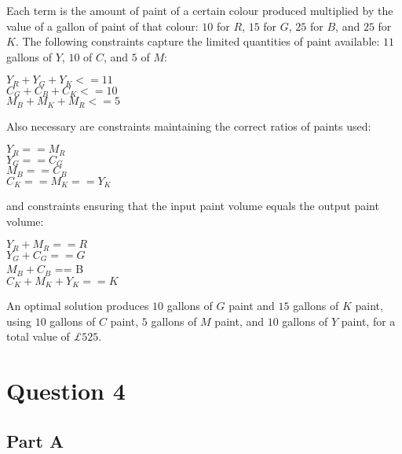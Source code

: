 \documentclass[11pt]{article} %
\begin{document}
Each term is the amount of paint of a certain colour produced multiplied by the value of a gallon of paint of that colour: $10$ for $R$, $15$ for $G$, $25$ for $B$, and $25$ for $K$. The following constraints capture the limited quantities of paint available: $11$ gallons of $Y$, $10$ of $C$, and $5$ of $M$:

\begin {center}

$Y_R + Y_G + Y_K <= 11$ \\
$C_G + C_B + C_K <= 10$ \\
$M_B + M_K +M_R <= 5$ \\

\end{center}

Also necessary are constraints maintaining the correct ratios of paints used:

\begin{center}

$Y_R == M_R$ \\
$Y_G == C_G$ \\
$M_B == C_B$ \\
$C_K == M_K == Y_K$ \\

\end{center}

and constraints ensuring that the input paint volume equals the output paint volume:

\begin{center}

$Y_R + M_R ==  R$ \\
$Y_G + C_G == G$ \\
$M_B + C_B$ == B \\
$C_K + M_K + Y_K == K$ \\

\end{center}

An optimal solution produces $10$ gallons of $G$ paint and $15$ gallons of $K$ paint, using $10$ gallons of $C$ paint, $5$ gallons of $M$ paint, and $10$ gallons of $Y$ paint, for a total value of \textit{£}$525$.

\clearpage

\section*{Question 4}

\subsection*{Part A} 
\end{document}
